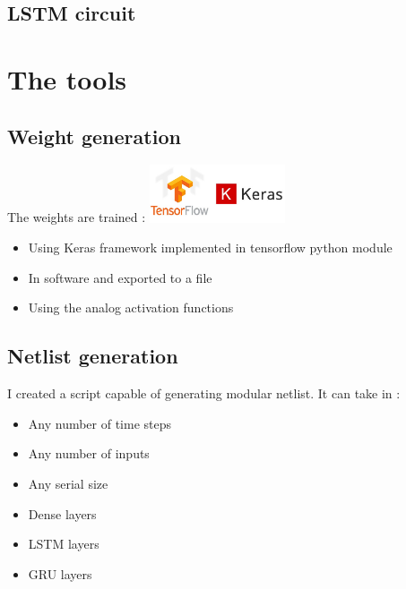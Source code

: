 \documentclass[14pt]{beamer}
\begin{document}
\subsection{LSTM circuit}

\begin{frame}{\insertsection}{\insertsubsection}
  \begin{center}
    
  \end{center}
\end{frame}


\section{The tools}
\subsection{Weight generation}
\begin{frame}{\insertsection}{\insertsubsection}
  The weights are trained :
  \hfill\includegraphics[width = 4cm]{tensorflowKeras.jpg}
  \begin{itemize}
    \item Using Keras framework implemented in tensorflow python module
    \item In software and exported to a file
    \item Using the analog activation functions
  \end{itemize}
\end{frame}

\subsection{Netlist generation}
\begin{frame}{\insertsection}{\insertsubsection}
  I created a script capable of generating modular netlist. It can take in :
  \begin{itemize}
    \item Any number of time steps
    \item Any number of inputs
    \item Any serial size
    \item Dense layers
    \item LSTM layers
    \item GRU layers
  \end{itemize}
\end{frame}
\end{document}
